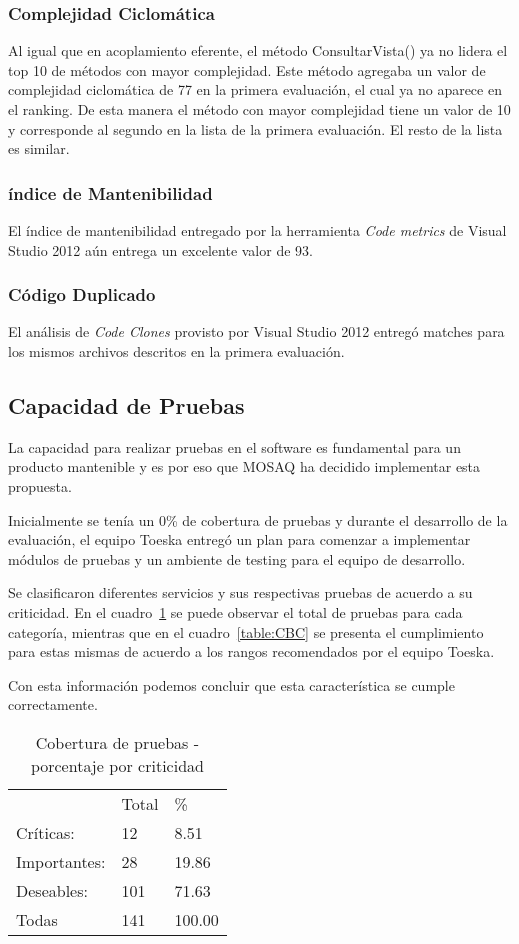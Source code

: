 \subsubsection{Complejidad Ciclomática}
Al igual que en acoplamiento eferente, el método ConsultarVista() ya no lidera el top 10 de métodos
con mayor complejidad. Este método agregaba un valor de complejidad 
ciclomática de 77 en la primera evaluación, el cual ya no aparece en el ranking. 
De esta manera el método con mayor complejidad tiene un valor de 10 y 
corresponde al segundo en la lista de la primera evaluación. El resto de la lista
es similar.
\subsubsection{índice de Mantenibilidad}
El índice de mantenibilidad entregado por la herramienta \textit{Code metrics} de Visual Studio 2012
aún entrega un excelente valor de 93.
\subsubsection{Código Duplicado}
El análisis de \textit{Code Clones} provisto por Visual Studio 2012 entregó matches para los 
mismos archivos descritos en la primera evaluación.
\subsection{Capacidad de Pruebas}
\label{cap}

La capacidad para realizar pruebas en el software es fundamental para un producto mantenible y es por eso
que MOSAQ ha decidido implementar esta propuesta.

Inicialmente se tenía un 0\% de cobertura de pruebas y durante el desarrollo de la evaluación, el equipo Toeska entregó un plan para comenzar a implementar
módulos de pruebas y un ambiente de testing para el equipo de desarrollo.

Se clasificaron diferentes servicios y sus respectivas pruebas de acuerdo a su criticidad.
En el cuadro~\ref{table:CBPC} se puede observar el total de pruebas para cada 
categoría, mientras que en el cuadro~\ref{table:CBC} se presenta el cumplimiento 
para estas mismas de acuerdo a los rangos recomendados por el equipo Toeska.

Con esta información podemos concluir que esta característica se cumple correctamente.
\begin{table}[hb]
\centering
    \begin{tabular}{lll}
    ~               & Total  & \%        \\
     		Críticas:    &  		12  &  		8.51   \\
     		Importantes: &  		28  &  		19.86  \\
     		Deseables:   &  		101 &  		71.63  \\
     		Todas        &  		141 &  		100.00 \\ \hline
    \end{tabular}
     \caption{Cobertura de pruebas - porcentaje por criticidad}
    \label{table:CBPC}
\end{table}

